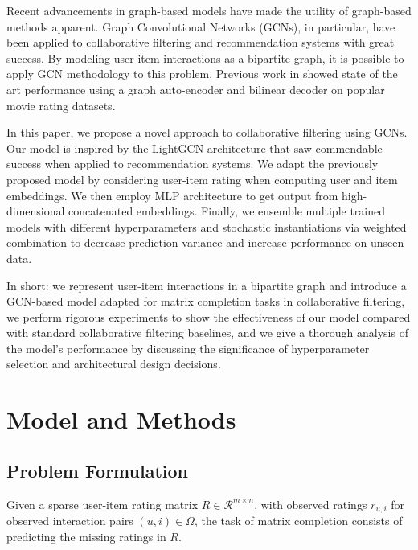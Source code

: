 \documentclass[10pt,conference,compsocconf]{IEEEtran}
\begin{document}
Recent advancements in graph-based models have made the utility of graph-based methods apparent. Graph Convolutional Networks (GCNs), in particular, have been applied to collaborative filtering and recommendation systems with great success. By modeling user-item interactions as a bipartite graph, it is possible to apply GCN methodology to this problem. Previous work in \cite{van2017graph} showed state of the art performance using a graph auto-encoder and bilinear decoder on popular movie rating datasets.

In this paper, we propose a novel approach to collaborative filtering using GCNs. Our model is inspired by the LightGCN \cite{he2020lightgcn} architecture that saw commendable success when applied to recommendation systems. We adapt the previously proposed model by considering user-item rating when computing user and item embeddings. We then employ MLP architecture to get output from high-dimensional concatenated embeddings. Finally, we ensemble multiple trained models with different hyperparameters and stochastic instantiations via weighted combination to decrease prediction variance and increase performance on unseen data.

In short: we represent user-item interactions in a bipartite graph and introduce a GCN-based model adapted for matrix completion tasks in collaborative filtering, we perform rigorous experiments to show the effectiveness of our model compared with standard collaborative filtering baselines, and we give a thorough analysis of the model's performance by discussing the significance of hyperparameter selection and architectural design decisions.

\section{Model and Methods}
\subsection{Problem Formulation}
Given a sparse user-item rating matrix $R \in \mathcal{R}^{m \times n}$, with observed ratings $r_{u,i}$ for observed interaction pairs $(u,i) \in \Omega$, the task of matrix completion consists of predicting the missing ratings in $R$.
\end{document}
